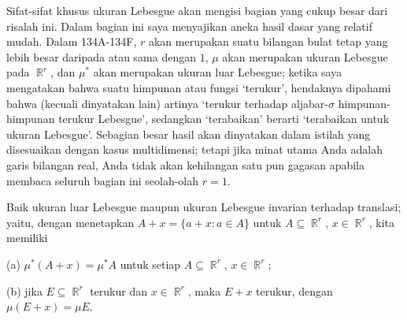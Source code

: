 
\def\chaptername{Pelengkap}
\def\sectionname{Lebih lanjut tentang ukuran Lebesgue}


Sifat-sifat khusus ukuran Lebesgue akan mengisi bagian yang cukup besar dari
risalah ini.
Dalam bagian ini saya menyajikan aneka hasil dasar yang relatif mudah. Dalam
134A-134F, %
$r$ akan merupakan suatu bilangan bulat tetap yang lebih besar daripada atau
sama dengan $1$, $\mu$ akan merupakan ukuran Lebesgue pada $\BbbR^r$, dan
$\mu^*$ akan merupakan ukuran luar Lebesgue; ketika saya
mengatakan bahwa suatu himpunan atau fungsi `terukur', hendaknya dipahami
bahwa (kecuali dinyatakan lain) artinya `terukur terhadap aljabar-$\sigma$
himpunan-himpunan terukur Lebesgue', sedangkan `terabaikan' berarti
`terabaikan untuk ukuran Lebesgue'. Sebagian besar hasil akan dinyatakan
dalam istilah yang disesuaikan dengan kasus multidimensi; tetapi jika minat
utama Anda adalah garis bilangan real, Anda tidak akan kehilangan satu pun
gagasan apabila membaca seluruh bagian ini seolah-olah $r=1$.

 Baik ukuran luar Lebesgue maupun ukuran Lebesgue
invarian terhadap translasi; yaitu, dengan menetapkan
$A+x=\{a+x:a\in A\}$ untuk $A\subseteq\BbbR^r$, $x\in\BbbR^r$, kita
memiliki

(a) $\mu^*(A+x)=\mu^* A$ untuk setiap $A\subseteq\BbbR^r$,
$x\in\BbbR^r$;

(b) jika $E\subseteq\BbbR^r$ terukur dan $x\in\BbbR^r$, maka $E+x$
terukur, dengan $\mu(E+x)=\mu E$.

